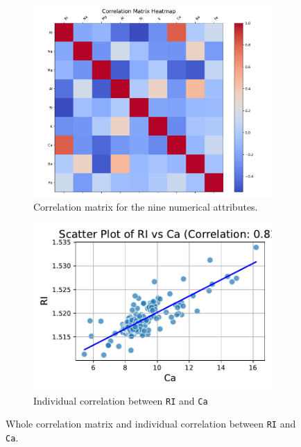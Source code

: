 \documentclass[dtu]{dtuarticle}
\begin{document}
	\begin{figure}[h!]
		\centering
		\begin{subfigure}{.49\textwidth}
			\centering
			\includegraphics[width=\textwidth]{figures/correlation_matrix}
			\caption{Correlation matrix for the nine numerical attributes.}
			\label{fig:correlation}
		\end{subfigure}
		\begin{subfigure}{.49\textwidth}
			\centering
			\includegraphics[width=\textwidth]{figures/scatter_RI_vs_Ca}
			\caption{Individual correlation between \texttt{RI} and \texttt{Ca}}
			\label{fig:individual-correlation}
		\end{subfigure}
		\caption{Whole correlation matrix and individual correlation between \texttt{RI} and \texttt{Ca}.}
	\end{figure}
\end{document}
